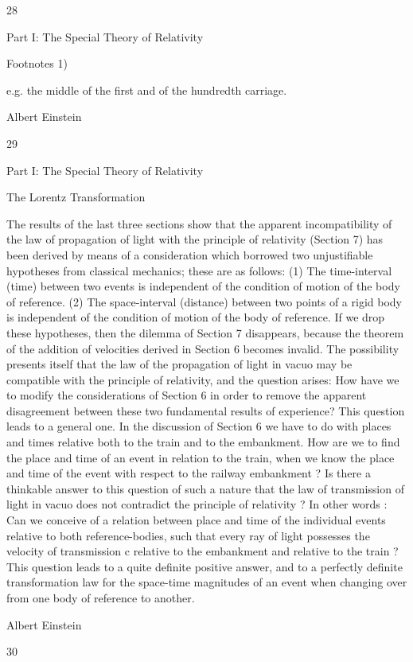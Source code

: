 \documentclass{article}
\begin{document}
28

Part I: The Special Theory of Relativity

Footnotes
1)

e.g. the middle of the first and of the hundredth carriage.

Albert Einstein

29

Part I: The Special Theory of Relativity

The Lorentz Transformation

The results of the last three sections show that the apparent incompatibility of the law of
propagation of light with the principle of relativity (Section 7) has been derived by means of
a consideration which borrowed two unjustifiable hypotheses from classical mechanics;
these are as follows:
(1) The time-interval (time) between two events is independent of
the condition of motion of the body of reference.
(2) The space-interval (distance) between two points of a rigid body
is independent of the condition of motion of the body of reference.
If we drop these hypotheses, then the dilemma of Section 7 disappears, because the
theorem of the addition of velocities derived in Section 6 becomes invalid. The possibility
presents itself that the law of the propagation of light in vacuo may be compatible with the
principle of relativity, and the question arises: How have we to modify the considerations of
Section 6 in order to remove the apparent disagreement between these two fundamental
results of experience? This question leads to a general one. In the discussion of Section 6
we have to do with places and times relative both to the train and to the embankment. How
are we to find the place and time of an event in relation to the train, when we know the
place and time of the event with respect to the railway embankment ? Is there a thinkable
answer to this question of such a nature that the law of transmission of light in vacuo does
not contradict the principle of relativity ? In other words : Can we conceive of a relation
between place and time of the individual events relative to both reference-bodies, such that
every ray of light possesses the velocity of transmission c relative to the embankment and
relative to the train ? This question leads to a quite definite positive answer, and to a
perfectly definite transformation law for the space-time magnitudes of an event when
changing over from one body of reference to another.

Albert Einstein

30
\end{document}

